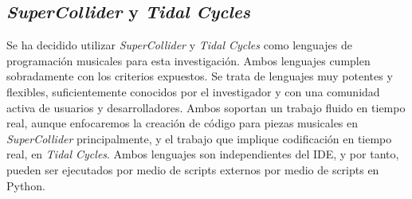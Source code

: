 \subsection{\emph{SuperCollider} y \emph{Tidal Cycles}}
Se ha decidido utilizar \emph{SuperCollider} y \emph{Tidal Cycles} como lenguajes de programación musicales para esta investigación. Ambos lenguajes cumplen sobradamente con los criterios expuestos. Se trata de lenguajes muy potentes y flexibles, suficientemente conocidos por el investigador y con una comunidad activa de usuarios y desarrolladores. Ambos soportan un trabajo fluido en tiempo real, aunque enfocaremos la creación de código para piezas musicales en \emph{SuperCollider} principalmente, y el trabajo que implique codificación en tiempo real, en \emph{Tidal Cycles}. Ambos lenguajes son independientes del IDE, y por tanto, pueden ser ejecutados por medio de scripts externos por medio de scripts en Python. 



